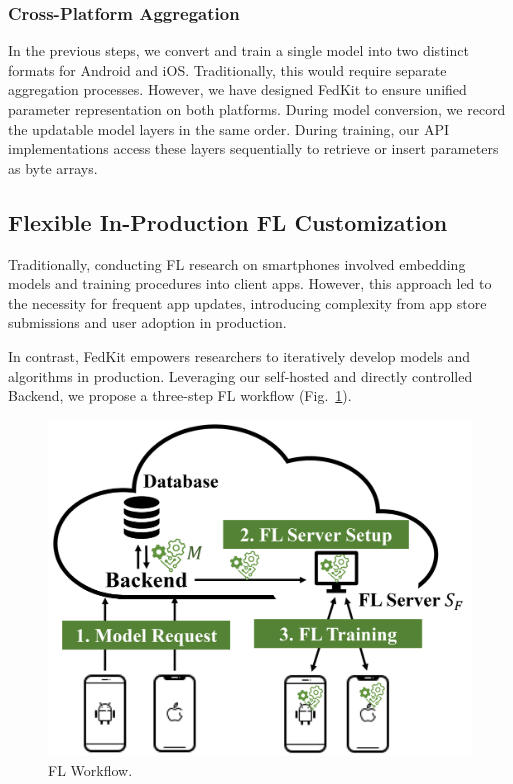 \documentclass[letterpaper]{article} %
\begin{document}
\subsubsection{Cross-Platform Aggregation}
In the previous steps,
we convert and train a single model into two distinct formats for
Android and iOS.
Traditionally, this would require separate aggregation processes.
However, we have designed FedKit to ensure unified parameter representation
on both platforms.
During model conversion,
we record the updatable model layers in the same order.
During training,
our API implementations access these layers sequentially to
retrieve or insert parameters as byte arrays.

\subsection{Flexible In-Production FL Customization}
\newcommand{\model}{$M$}
\newcommand{\fs}{$S_\mathrm F$}
Traditionally, conducting FL research on smartphones involved
embedding models and training procedures into client apps.
However, this approach led to the necessity for frequent app updates,
introducing complexity from app store submissions and user adoption
in production.

In contrast,
FedKit empowers researchers to iteratively develop models and algorithms
in production.
Leveraging our self-hosted and directly controlled Backend,
we propose a three-step FL workflow
(Fig.~\ref{fig:fl-workflow}).
\begin{figure}
    \centering
    \includegraphics*[width=0.8\linewidth]{fl_workflow.pdf}
    \caption{FL Workflow.}
    \label{fig:fl-workflow}
\end{figure}
\end{document}
